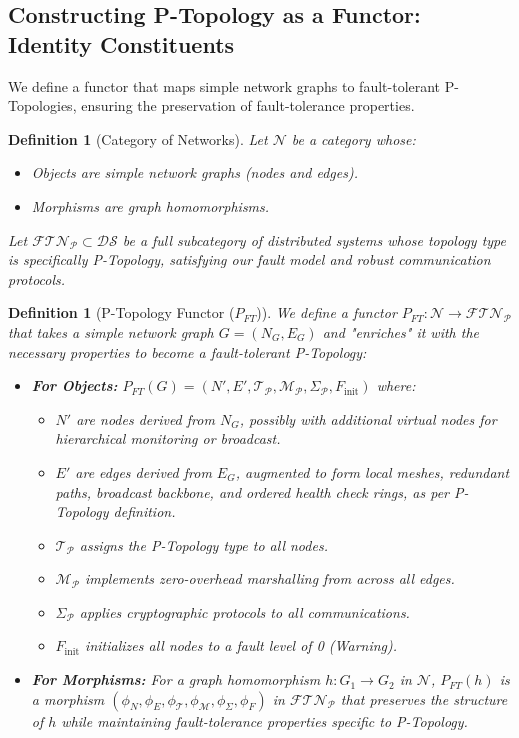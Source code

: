 \documentclass[10pt]{article}
\newtheorem{definition}[theorem]{Definition
}
\begin{document}
\subsection{Constructing P-Topology as a Functor: Identity Constituents}
We define a functor that maps simple network graphs to fault-tolerant P-Topologies, ensuring the preservation of fault-tolerance properties.

\begin{definition}[Category of Networks]
Let $\mathcal{N}$ be a category whose:
\begin{itemize}
    \item Objects are simple network graphs (nodes and edges).
    \item Morphisms are graph homomorphisms.
\end{itemize}
Let $\mathcal{FTN}_{\mathcal{P}} \subset \mathcal{DS}$ be a full subcategory of distributed systems whose topology type is specifically P-Topology, satisfying our fault model and robust communication protocols.
\end{definition}

\begin{definition}[P-Topology Functor ($P_{FT}$)]
We define a functor $P_{FT}:\mathcal{N}\rightarrow \mathcal{FTN}_{\mathcal{P}}$ that takes a simple network graph $G=(N_G, E_G)$ and "enriches" it with the necessary properties to become a fault-tolerant P-Topology:
\begin{itemize}
    \item \textbf{For Objects:} $P_{FT}(G)=(N',E',\mathcal{T}_{\mathcal{P}},\mathcal{M}_{\mathcal{P}},\Sigma_{\mathcal{P}},F_{\text{init}})$ where:
        \begin{itemize}
            \item $N'$ are nodes derived from $N_G$, possibly with additional virtual nodes for hierarchical monitoring or broadcast.
            \item $E'$ are edges derived from $E_G$, augmented to form local meshes, redundant paths, broadcast backbone, and ordered health check rings, as per P-Topology definition.
            \item $\mathcal{T}_{\mathcal{P}}$ assigns the P-Topology type to all nodes.
            \item $\mathcal{M}_{\mathcal{P}}$ implements zero-overhead marshalling from \cite{OBINexusDataMarshalling} across all edges.
            \item $\Sigma_{\mathcal{P}}$ applies cryptographic protocols to all communications.
            \item $F_{\text{init}}$ initializes all nodes to a fault level of 0 (Warning).
        \end{itemize}
    \item \textbf{For Morphisms:} For a graph homomorphism $h:G_{1}\rightarrow G_{2}$ in $\mathcal{N}$, $P_{FT}(h)$ is a morphism $(\phi_{N},\phi_{E},\phi_{\mathcal{T}},\phi_{\mathcal{M}},\phi_{\Sigma},\phi_{F})$ in $\mathcal{FTN}_{\mathcal{P}}$ that preserves the structure of $h$ while maintaining fault-tolerance properties specific to P-Topology.
\end{itemize}
\end{definition}
\end{document}
